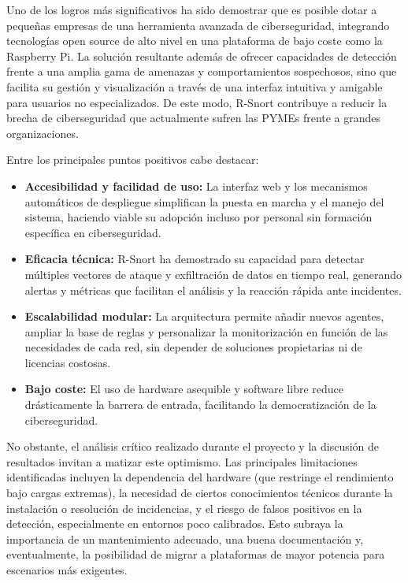 \documentclass[11pt,a4paper,twoside]{report}
\begin{document}
Uno de los logros más significativos ha sido demostrar que es posible dotar a pequeñas empresas de una herramienta avanzada de ciberseguridad, integrando tecnologías open source de alto nivel en una plataforma de bajo coste como la Raspberry Pi. La solución resultante además de ofrecer capacidades de detección frente a una amplia gama de amenazas y comportamientos sospechosos, sino que facilita su gestión y visualización a través de una interfaz intuitiva y amigable para usuarios no especializados. De este modo, R-Snort contribuye a reducir la brecha de ciberseguridad que actualmente sufren las PYMEs frente a grandes organizaciones.\newline

Entre los principales puntos positivos cabe destacar:

\begin{itemize}
	\item \textbf{Accesibilidad y facilidad de uso:} La interfaz web y los mecanismos automáticos de despliegue simplifican la puesta en marcha y el manejo del sistema, haciendo viable su adopción incluso por personal sin formación específica en ciberseguridad.
	\item \textbf{Eficacia técnica:} R-Snort ha demostrado su capacidad para detectar múltiples vectores de ataque y exfiltración de datos en tiempo real, generando alertas y métricas que facilitan el análisis y la reacción rápida ante incidentes.
	\item \textbf{Escalabilidad modular:} La arquitectura permite añadir nuevos agentes, ampliar la base de reglas y personalizar la monitorización en función de las necesidades de cada red, sin depender de soluciones propietarias ni de licencias costosas.
	\item \textbf{Bajo coste:} El uso de hardware asequible y software libre reduce drásticamente la barrera de entrada, facilitando la democratización de la ciberseguridad.
\end{itemize}

No obstante, el análisis crítico realizado durante el proyecto y la discusión de resultados invitan a matizar este optimismo. Las principales limitaciones identificadas incluyen la dependencia del hardware (que restringe el rendimiento bajo cargas extremas), la necesidad de ciertos conocimientos técnicos durante la instalación o resolución de incidencias, y el riesgo de falsos positivos en la detección, especialmente en entornos poco calibrados. Esto subraya la importancia de un mantenimiento adecuado, una buena documentación y, eventualmente, la posibilidad de migrar a plataformas de mayor potencia para escenarios más exigentes.\newline
\end{document}
